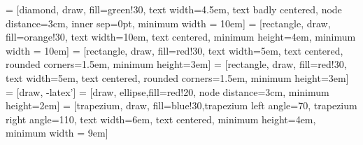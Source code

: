 \newcommand\R{\cellcolor{red!30}}
\newcommand\V{\cellcolor{green!30}}
\newcommand{\tikzredcircle}[2][red,fill=red]{\tikz[baseline=-0.5ex]\draw[#1,radius=#2] (0,0) circle ;}%
\newcommand{\tikzgreencircle}[2][green,fill=green]{\tikz[baseline=-0.5ex]\draw[#1,radius=#2] (0,0) circle ;}%










 = [diamond, draw, fill=green!30,
text width=4.5em, text badly centered, node distance=3cm, inner sep=0pt, minimum width = 10em]
 = [rectangle, draw, fill=orange!30,
text width=10em, text centered,  minimum height=4em, minimum width = 10em]
 = [rectangle, draw, fill=red!30,
text width=5em, text centered, rounded corners=1.5em, minimum height=3em]
 = [rectangle, draw, fill=red!30,
text width=5em, text centered, rounded corners=1.5em, minimum height=3em]
 = [draw, -latex']
 = [draw, ellipse,fill=red!20, node distance=3cm,
minimum height=2em]
 = [trapezium, draw, fill=blue!30,trapezium left angle=70, trapezium right angle=110,
text width=6em, text centered,  minimum height=4em, minimum width = 9em]



		




